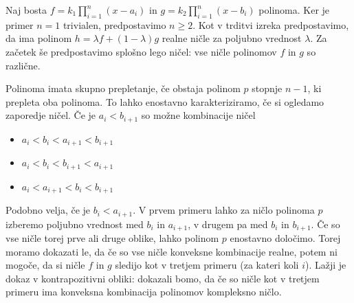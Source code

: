 \begin{dokaz}
    Naj bosta \(f =  k_1 \prod_{i=1}^n (x-a_i)\) in \(g =  k_2 \prod_{i=1}^n (x-b_i)\) polinoma. Ker je primer \(n=1\) trivialen, predpostavimo \(n\geq2\). Kot v trditvi izreka predpostavimo, da ima polinom \(h = \lambda f + (1-\lambda) g\) realne ničle za poljubno vrednost \(\lambda\). Za začetek še predpostavimo splošno lego ničel: vse ničle polinomov \(f\) in \(g\) so različne.

    Polinoma imata skupno prepletanje, če obstaja polinom \(p\) stopnje \(n-1\), ki prepleta oba polinoma. To lahko enostavno karakteriziramo, če si ogledamo zaporedje ničel. Če je \(a_i < b_{i+1}\) so možne kombinacije ničel
    \begin{itemize}
        \item \(a_i < b_i < a_{i+1} < b_{i+1}\)
        \item \(a_i < b_i < b_{i+1} < a_{i+1}\)
        \item \(a_i < a_{i+1} < b_i < b_{i+1}\)
    \end{itemize}
    Podobno velja, če je \(b_i < a_{i+1}\). V prvem primeru lahko za ničlo polinoma \(p\) izberemo poljubno vrednost med \(b_{i}\) in \(a_{i+1}\), v drugem pa med \(b_i\) in \(b_{i+1}\). Če so vse ničle torej prve ali druge oblike, lahko polinom \(p\) enostavno določimo. Torej moramo dokazati le, da če so vse ničle konveksne kombinacije realne, potem ni mogoče, da si ničle \(f\) in \(g\) sledijo kot v tretjem primeru (za kateri koli \(i\)). Lažji je dokaz v kontrapozitivni obliki: dokazali bomo, da če so ničle kot v tretjem primeru ima konveksna kombinacija polinomov kompleksno ničlo.


\end{dokaz}
